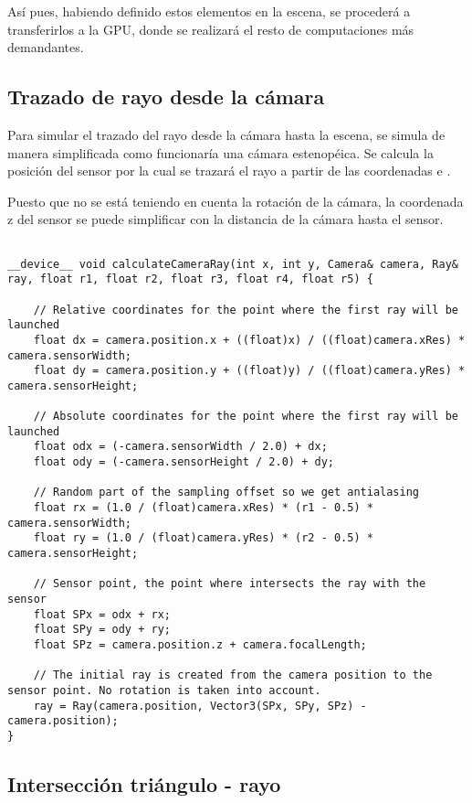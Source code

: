 Así pues, habiendo definido estos elementos en la escena, se procederá a transferirlos a la GPU, donde se realizará el resto de computaciones más demandantes. 


	\subsection{Trazado de rayo desde la cámara}

Para simular el trazado del rayo desde la cámara hasta la escena, se simula de manera simplificada como funcionaría una cámara estenopéica. Se calcula la posición del sensor por la cual se trazará el rayo a partir de las coordenadas  e . 

Puesto que no se está teniendo en cuenta la rotación de la cámara, la coordenada z del sensor se puede simplificar con la distancia de la cámara hasta el sensor.

\begin{lstlisting}
	
__device__ void calculateCameraRay(int x, int y, Camera& camera, Ray& ray, float r1, float r2, float r3, float r4, float r5) {

    // Relative coordinates for the point where the first ray will be launched
    float dx = camera.position.x + ((float)x) / ((float)camera.xRes) * camera.sensorWidth;
    float dy = camera.position.y + ((float)y) / ((float)camera.yRes) * camera.sensorHeight;

    // Absolute coordinates for the point where the first ray will be launched
    float odx = (-camera.sensorWidth / 2.0) + dx;
    float ody = (-camera.sensorHeight / 2.0) + dy;

    // Random part of the sampling offset so we get antialasing
    float rx = (1.0 / (float)camera.xRes) * (r1 - 0.5) * camera.sensorWidth;
    float ry = (1.0 / (float)camera.yRes) * (r2 - 0.5) * camera.sensorHeight;

    // Sensor point, the point where intersects the ray with the sensor
    float SPx = odx + rx;
    float SPy = ody + ry;
    float SPz = camera.position.z + camera.focalLength;

    // The initial ray is created from the camera position to the sensor point. No rotation is taken into account.
    ray = Ray(camera.position, Vector3(SPx, SPy, SPz) - camera.position);
}

\end{lstlisting}

	\subsection{Intersección triángulo - rayo}
	\label{subsec:triintersection}
	
